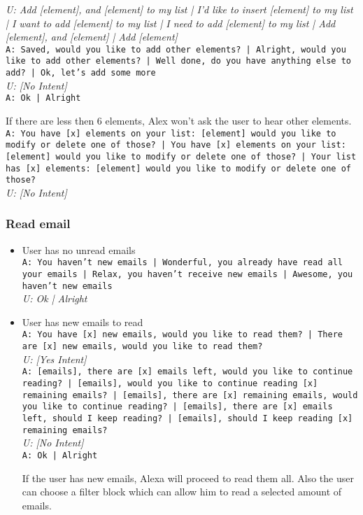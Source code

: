 \begin{itemize}
\begin{itemize}
		\textit{U: Add [element], and [element] to my list | I'd like to insert [element] to my list | I want to add [element] to my list | I need to add [element] to my list | Add [element], and [element] | Add [element]}\\
		\texttt{A: Saved, would you like to add other elements? | Alright, would you like to add other elements? | Well done, do you have anything else to add? | Ok, let's add some more}\\
		\textit{U: [No Intent]}\\
		\texttt{A: Ok | Alright}
	\end{itemize}
	
	If there are less then 6 elements, Alex won't ask the user to hear other elements.\\
	\texttt{A: You have [x] elements on your list: [element] would you like to modify or delete one of those? | You have [x] elements on your list: [element] would you like to modify or delete one of those? | Your list has [x] elements: [element] would you like to modify or delete one of those?}\\
	\textit{U: [No Intent]}
\end{itemize}

\subsubsection{Read email}
\begin{itemize}
	\item User has no unread emails\\
	\texttt{A: You haven't new emails | Wonderful, you already have read all your emails | Relax, you haven't receive new emails | Awesome, you haven't new emails}\\
	\textit{U: Ok | Alright}
	\item User has new emails to read\\
	\texttt{A: You have [x] new emails, would you like to read them? | There are [x] new emails, would you like to read them? }\\
	\textit{U: [Yes Intent]}\\
	\texttt{A: [emails], there are [x] emails left, would you like to continue reading? | [emails], would you like to continue reading [x] remaining emails? | [emails], there are [x] remaining emails, would you like to continue reading? | [emails], there are [x] emails left, should I keep reading? | [emails], should I keep reading [x] remaining emails?}\\
	\textit{U: [No Intent] }\\
	\texttt{A: Ok | Alright}
	
	If the user has new emails, Alexa will proceed to read them all. Also the user can choose a filter block which can allow him to read a selected amount of emails.
\end{itemize}

